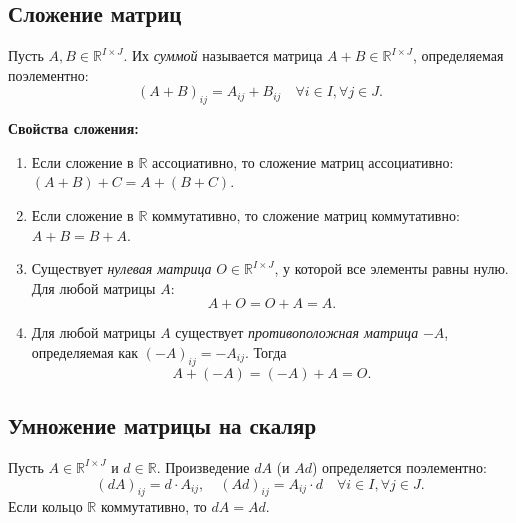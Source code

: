 \documentclass[a4paper,12pt]{article}
\theoremstyle{definition}
\theoremstyle{plain}
\theoremstyle{remark}
\begin{document}
	\subsection{Сложение матриц}
	
	\begin{tcolorbox}[colback=green!5, colframe=green!50!black, title=Определение сложения]
		Пусть \( A, B \in \mathbb{R}^{I \times J} \). Их \textit{суммой} называется матрица \( A + B \in \mathbb{R}^{I \times J} \), определяемая поэлементно:
		\[
		(A + B)_{ij} = A_{ij} + B_{ij} \quad \forall i \in I, \forall j \in J.
		\]
	\end{tcolorbox}
	
	\medskip
	\noindent \textbf{Свойства сложения:}
	\begin{enumerate}
		\item Если сложение в \( \mathbb{R} \) ассоциативно, то сложение матриц ассоциативно: \( (A + B) + C = A + (B + C) \).
		\item Если сложение в \( \mathbb{R} \) коммутативно, то сложение матриц коммутативно: \( A + B = B + A \).
		\item Существует \textit{нулевая матрица} \( O \in \mathbb{R}^{I \times J} \), у которой все элементы равны нулю. Для любой матрицы \( A \):
		\[
		A + O = O + A = A.
		\]
		\item Для любой матрицы \( A \) существует \textit{противоположная матрица} \( -A \), определяемая как \( (-A)_{ij} = -A_{ij} \). Тогда
		\[
		A + (-A) = (-A) + A = O.
		\]
	\end{enumerate}
	
	\subsection{Умножение матрицы на скаляр}
	
	\begin{tcolorbox}[colback=green!5, colframe=green!50!black, title=Определение умножения на скаляр]
		Пусть \( A \in \mathbb{R}^{I \times J} \) и \( d \in \mathbb{R} \). Произведение \( dA \) (и \( Ad \)) определяется поэлементно:
		\[
		(dA)_{ij} = d \cdot A_{ij}, \quad (Ad)_{ij} = A_{ij} \cdot d \quad \forall i \in I, \forall j \in J.
		\]
		Если кольцо \( \mathbb{R} \) коммутативно, то \( dA = Ad \).
	\end{tcolorbox}
	
\end{document}
